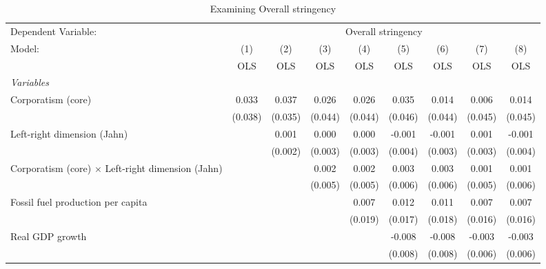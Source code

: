 
\begin{table}[htbp]
   \caption{Examining Overall stringency}
   \centering
   \begin{tabular}{lcccccccc}
      \toprule
      Dependent Variable: & \multicolumn{8}{c}{Overall stringency}\\
      Model:                                                   & (1)     & (2)     & (3)     & (4)     & (5)     & (6)     & (7)     & (8)\\  
                                                               &  OLS    & OLS     & OLS     & OLS     & OLS     & OLS     & OLS     & OLS\\  
      \midrule
      \emph{Variables}\\
      Corporatism (core)                                       & 0.033   & 0.037   & 0.026   & 0.026   & 0.035   & 0.014   & 0.006   & 0.014\\   
                                                               & (0.038) & (0.035) & (0.044) & (0.044) & (0.046) & (0.044) & (0.045) & (0.045)\\   
      Left-right dimension (Jahn)                              &         & 0.001   & 0.000   & 0.000   & -0.001  & -0.001  & 0.001   & -0.001\\   
                                                               &         & (0.002) & (0.003) & (0.003) & (0.004) & (0.003) & (0.003) & (0.004)\\   
      Corporatism (core) $\times$ Left-right dimension (Jahn)  &         &         & 0.002   & 0.002   & 0.003   & 0.003   & 0.001   & 0.001\\   
                                                               &         &         & (0.005) & (0.005) & (0.006) & (0.006) & (0.005) & (0.006)\\   
      Fossil fuel production per capita                        &         &         &         & 0.007   & 0.012   & 0.011   & 0.007   & 0.007\\   
                                                               &         &         &         & (0.019) & (0.017) & (0.018) & (0.016) & (0.016)\\   
      Real GDP growth                                          &         &         &         &         & -0.008  & -0.008  & -0.003  & -0.003\\   
                                                               &         &         &         &         & (0.008) & (0.008) & (0.006) & (0.006)\\   

\end{tabular}
\end{table}
